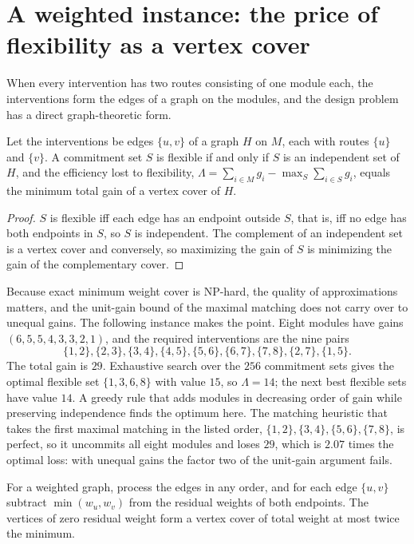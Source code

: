 \section[A weighted instance]{A weighted instance: the price of flexibility as a vertex cover}\label{sec:weighted-instance}

When every intervention has two routes consisting of one module each, the interventions form the edges of a graph on the modules, and the design problem has a direct graph-theoretic form.

\begin{newresult}\label{prop:cover-price}
Let the interventions be edges $\{u,v\}$ of a graph $H$ on $M$, each with routes $\{u\}$ and $\{v\}$. A commitment set $S$ is flexible if and only if $S$ is an independent set of $H$, and the efficiency lost to flexibility, $\Lambda=\sum_{i\in M}g_i-\max_S\sum_{i\in S}g_i$, equals the minimum total gain of a vertex cover of $H$.
\end{newresult}
\begin{proof}
$S$ is flexible iff each edge has an endpoint outside $S$, that is, iff no edge has both endpoints in $S$, so $S$ is independent. The complement of an independent set is a vertex cover and conversely, so maximizing the gain of $S$ is minimizing the gain of the complementary cover.
\end{proof}

Because exact minimum weight cover is NP-hard, the quality of approximations matters, and the unit-gain bound of the maximal matching does not carry over to unequal gains. The following instance makes the point. Eight modules have gains $(6,5,5,4,3,3,2,1)$, and the required interventions are the nine pairs
\[
\{1,2\},\{2,3\},\{3,4\},\{4,5\},\{5,6\},\{6,7\},\{7,8\},\{2,7\},\{1,5\}.
\]
The total gain is $29$. Exhaustive search over the $256$ commitment sets gives the optimal flexible set $\{1,3,6,8\}$ with value $15$, so $\Lambda=14$; the next best flexible sets have value $14$. A greedy rule that adds modules in decreasing order of gain while preserving independence finds the optimum here. The matching heuristic that takes the first maximal matching in the listed order, $\{1,2\},\{3,4\},\{5,6\},\{7,8\}$, is perfect, so it uncommits all eight modules and loses $29$, which is $2.07$ times the optimal loss: with unequal gains the factor two of the unit-gain argument fails.

\begin{established}\label{thm:local-ratio}
For a weighted graph, process the edges in any order, and for each edge $\{u,v\}$ subtract $\min(w_u,w_v)$ from the residual weights of both endpoints. The vertices of zero residual weight form a vertex cover of total weight at most twice the minimum.
\end{established}

